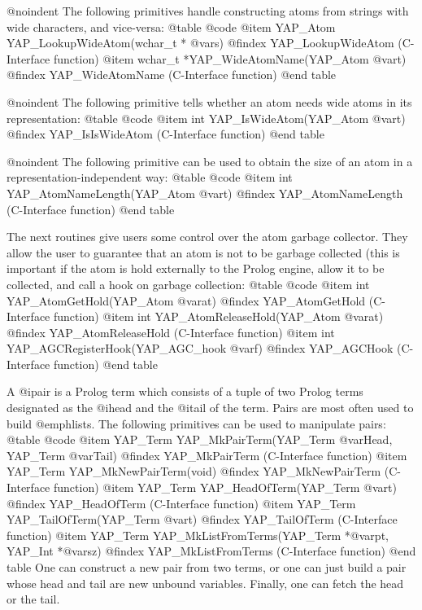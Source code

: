 @noindent
The following primitives handle constructing atoms from strings with
wide characters, and vice-versa:
@table @code
  @item    YAP_Atom  YAP_LookupWideAtom(wchar_t * @var{s})
@findex YAP_LookupWideAtom (C-Interface function)
   @item   wchar_t  *YAP_WideAtomName(YAP_Atom @var{t})
@findex YAP_WideAtomName (C-Interface function)
@end table

@noindent
The following primitive tells whether an atom needs wide atoms in its
representation:
@table @code
@item      int  YAP_IsWideAtom(YAP_Atom @var{t})
@findex YAP_IsIsWideAtom (C-Interface function)
@end table

@noindent
The following primitive can be used to obtain the size of an atom in a
representation-independent way: 
@table @code
 @item     int      YAP_AtomNameLength(YAP_Atom @var{t})
@findex YAP_AtomNameLength (C-Interface function)
@end table

The next routines give users some control over  the atom
garbage collector. They allow the user to guarantee that an atom is not
to be garbage collected (this is important if the atom is hold
externally to the Prolog engine, allow it to be collected, and call a
hook on garbage collection:
@table @code
  @item    int  YAP_AtomGetHold(YAP_Atom @var{at})
@findex YAP_AtomGetHold  (C-Interface function)
@item      int  YAP_AtomReleaseHold(YAP_Atom @var{at})
@findex YAP_AtomReleaseHold  (C-Interface function)
 @item     int  YAP_AGCRegisterHook(YAP_AGC_hook @var{f})
@findex YAP_AGCHook  (C-Interface function)
@end table

A @i{pair} is a Prolog term which consists of a tuple of two Prolog
terms designated as the @i{head} and the @i{tail} of the term. Pairs are
most often used to build @emph{lists}. The following primitives can be
used to manipulate pairs:
@table @code
 @item     YAP_Term  YAP_MkPairTerm(YAP_Term @var{Head}, YAP_Term @var{Tail})
@findex YAP_MkPairTerm (C-Interface function)
 @item     YAP_Term  YAP_MkNewPairTerm(void)
@findex YAP_MkNewPairTerm (C-Interface function)
  @item    YAP_Term  YAP_HeadOfTerm(YAP_Term @var{t})
@findex YAP_HeadOfTerm (C-Interface function)
 @item     YAP_Term  YAP_TailOfTerm(YAP_Term @var{t})
@findex YAP_TailOfTerm (C-Interface function)
  @item    YAP_Term  YAP_MkListFromTerms(YAP_Term *@var{pt}, YAP_Int *@var{sz})
@findex YAP_MkListFromTerms (C-Interface function)
@end table
One can construct a new pair from two terms, or one can just build a
pair whose head and tail are new unbound variables. Finally, one can
fetch the head or the tail.

